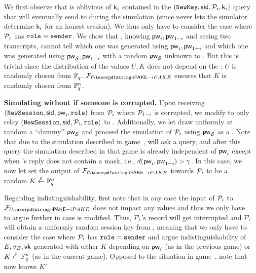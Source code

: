 \begin{games}
We first observe that \Env is oblivious of $\mathsf{k}_{i}$ contained in the $(\texttt{NewKey},\mathsf{sid},\mathcal{P}_{i},\mathsf{k}_{i})$ query that \Sim will eventually send to \Func during the simulation (since \Func never lets the simulator determine $\mathsf{k}_{i}$ for an honest session). We thus only have to consider the case where $\mathcal{P}_{i}$ has $\texttt{role}=\texttt{sender}$. We show that \Env, knowing $\mathsf{pw}_{i},\mathsf{pw}_{1-i}$ and seeing two transcripts, cannot tell which one  was generated using $\mathsf{pw}_{i},\mathsf{pw}_{1-i}$ and which one was generated using  $\mathsf{pw}_\mathcal{S},\mathsf{pw}_{1-i}$ with a random $\mathsf{pw}_\mathcal{S}$ unknown to \Env. But this is trivial since the distribution of the values $U,K$ does not depend on the \passwords: $U$ is randomly chosen from $\mathbb{F}_q$. $\FliPAKE$ ensures that $K$ is randomly chosen from $\mathbb{F}_q^{n}$. 

\textbf{Simulating without \password if someone is corrupted.}
Upon receiving $(\texttt{NewSession},\mathsf{sid},\mathsf{pw}_{i},\texttt{role})$ from $\mathcal{P}_{i}$ where $\mathcal{P}_{1-i}$ is corrupted, we modify \Func to only relay $(\texttt{NewSession},\mathsf{sid},\mathcal{P}_{i},\texttt{role})$ to \Sim. Additionally, we let \Sim draw uniformly at random a ``dummy'' \password $\mathsf{pw}_\mathcal{S}$ and proceed the simulation of $\mathcal{P}_{i}$ using $\mathsf{pw}_\mathcal{S}$ as a \password. Note that due to the simulation described in game~, \Sim will ask a \TestPwd query, and after this query the simulation described in that game is already independent of $\mathsf{pw}_{i}$ except when \Func's reply does not contain a mask, i.e., $d(\mathsf{pw}_{i},\mathsf{pw}_{1-i})> \gamma$. In this case, we now let \Sim set the output of $\FliPAKE$ towards $\mathcal{P}_{i}$ to be a random $K\stackrel{{}_\$}{\leftarrow}\mathbb{F}_q^{n}$. 

Regarding indistinguishability, first note that in any case the input of $\mathcal{P}_{i}$ to $\FliPAKE$ does not impact any values and thus we only have to argue further in case \Sim is modified. Thus, $\mathcal{P}_{i}$'s record will get interrupted and $\mathcal{P}_{i}$ will obtain a uniformly random session key from \Func, meaning that we only have to consider the case where $\mathcal{P}_{i}$ has $\texttt{role}=\texttt{sender}$ and argue indistinguishability of $E,\sigma_E,\mathsf{vk}$ generated with either $K$ depending on $\mathsf{pw}_{i}$ (as in the previous game) or $K\stackrel{{}_\$}{\leftarrow}\mathbb{F}_q^{n}$ (as in the current game). Opposed to the situation in game~\previousgame, note that now \Env knows $K'$. 


\end{games}
